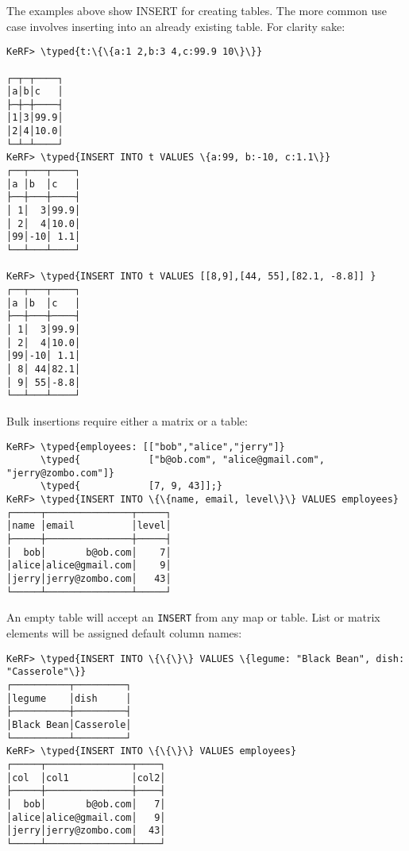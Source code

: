 \documentclass{article}
\newcommand{\typed}[1]{\textcolor{TealBlue}{#1}}
\newcommand{\comment}[1]{\textcolor{Orange}{#1}}
\begin{document}
The examples above show INSERT for creating tables. The more common use case involves inserting into an already existing table. For clarity sake:

\begin{Verbatim}
KeRF> \typed{t:\{\{a:1 2,b:3 4,c:99.9 10\}\}}

┌─┬─┬────┐
│a│b│c   │
├─┼─┼────┤
│1│3│99.9│
│2│4│10.0│
└─┴─┴────┘
KeRF> \typed{INSERT INTO t VALUES \{a:99, b:-10, c:1.1\}}
┌──┬───┬────┐
│a │b  │c   │
├──┼───┼────┤
│ 1│  3│99.9│
│ 2│  4│10.0│
│99│-10│ 1.1│
└──┴───┴────┘

KeRF> \typed{INSERT INTO t VALUES [[8,9],[44, 55],[82.1, -8.8]] }
┌──┬───┬────┐
│a │b  │c   │
├──┼───┼────┤
│ 1│  3│99.9│
│ 2│  4│10.0│
│99│-10│ 1.1│
│ 8│ 44│82.1│
│ 9│ 55│-8.8│
└──┴───┴────┘

\end{Verbatim}
\pagebreak


Bulk insertions require either a matrix or a table:
\begin{Verbatim}
KeRF> \typed{employees: [["bob","alice","jerry"]}
      \typed{            ["b@ob.com", "alice@gmail.com", "jerry@zombo.com"]}
      \typed{            [7, 9, 43]];}
KeRF> \typed{INSERT INTO \{\{name, email, level\}\} VALUES employees}
┌─────┬───────────────┬─────┐
│name │email          │level│
├─────┼───────────────┼─────┤
│  bob│       b@ob.com│    7│
│alice│alice@gmail.com│    9│
│jerry│jerry@zombo.com│   43│
└─────┴───────────────┴─────┘
\end{Verbatim}

An empty table will accept an \texttt{INSERT} from any map or table. List or matrix elements will be assigned default column names:
\begin{Verbatim}
KeRF> \typed{INSERT INTO \{\{\}\} VALUES \{legume: "Black Bean", dish: "Casserole"\}}
┌──────────┬─────────┐
│legume    │dish     │
├──────────┼─────────┤
│Black Bean│Casserole│
└──────────┴─────────┘
KeRF> \typed{INSERT INTO \{\{\}\} VALUES employees}
┌─────┬───────────────┬────┐
│col  │col1           │col2│
├─────┼───────────────┼────┤
│  bob│       b@ob.com│   7│
│alice│alice@gmail.com│   9│
│jerry│jerry@zombo.com│  43│
└─────┴───────────────┴────┘
\end{Verbatim}
\end{document}
